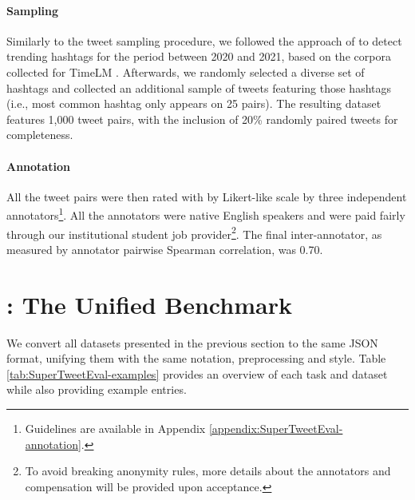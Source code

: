 \paragraph{Sampling} Similarly to the {\TempoWiC} tweet sampling procedure, we followed the approach of  to detect trending hashtags for the period between 2020 and 2021, based on the corpora collected for TimeLM \cite{loureiro-etal-2022-timelms}. Afterwards, we randomly selected a diverse set of hashtags and collected an additional sample of tweets featuring those hashtags (i.e., most common hashtag only appears on 25 pairs). The resulting dataset features 1,000 tweet pairs, with the inclusion of 20\% randomly paired tweets for completeness.

\paragraph{Annotation} All the tweet pairs were then rated with by Likert-like scale by three independent annotators\footnote{Guidelines are available in Appendix \ref{appendix:SuperTweetEval-annotation}.}. All the annotators were native English speakers and were paid fairly through our institutional student job provider\footnote{To avoid breaking anonymity rules, more details about the annotators and compensation will be provided upon acceptance.}. The final inter-annotator, as measured by annotator pairwise Spearman correlation, was 0.70.

\section{{\DATASET}: The Unified Benchmark}
We convert all datasets presented in the previous section to the same JSON format, unifying them with the same notation, preprocessing and style. Table \ref{tab:SuperTweetEval-examples} provides an overview of each task and dataset while also providing example entries.


